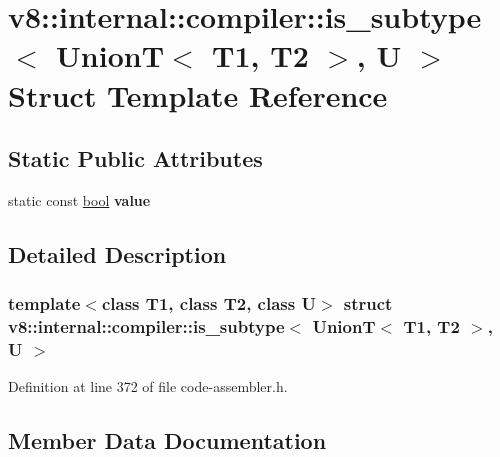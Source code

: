 \hypertarget{structv8_1_1internal_1_1compiler_1_1is__subtype_3_01UnionT_3_01T1_00_01T2_01_4_00_01U_01_4}{}\section{v8\+:\+:internal\+:\+:compiler\+:\+:is\+\_\+subtype$<$ UnionT$<$ T1, T2 $>$, U $>$ Struct Template Reference}
\label{structv8_1_1internal_1_1compiler_1_1is__subtype_3_01UnionT_3_01T1_00_01T2_01_4_00_01U_01_4}
\subsection*{Static Public Attributes}
\begin{DoxyCompactItemize}
\item 
static const \mbox{\hyperlink{classbool}{bool}} {\bfseries value}
\end{DoxyCompactItemize}


\subsection{Detailed Description}
\subsubsection*{template$<$class T1, class T2, class U$>$\newline
struct v8\+::internal\+::compiler\+::is\+\_\+subtype$<$ Union\+T$<$ T1, T2 $>$, U $>$}



Definition at line 372 of file code-\/assembler.\+h.



\subsection{Member Data Documentation}
\mbox{\label{structv8_1_1internal_1_1compiler_1_1is__subtype_3_01UnionT_3_01T1_00_01T2_01_4_00_01U_01_4_a6bf674422bbcb36950810b0a1c3703b4}} 
